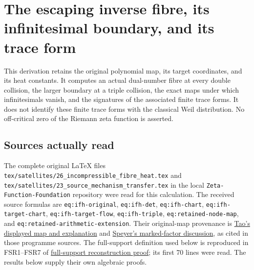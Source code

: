 \documentclass[
  10pt,
  a4paper,
]{article}
\author{}
\date{}
\begin{document}
{
\setcounter{tocdepth}{3}
\tableofcontents
}
\section{The escaping inverse fibre, its infinitesimal boundary, and its
trace
form}\label{the-escaping-inverse-fibre-its-infinitesimal-boundary-and-its-trace-form}

This derivation retains the original polynomial map, its target
coordinates, and its heat constants. It computes an actual dual-number
fibre at every double collision, the larger boundary at a triple
collision, the exact maps under which infinitesimals vanish, and the
signatures of the associated finite trace forms. It does not identify
these finite trace forms with the classical Weil distribution. No
off-critical zero of the Riemann zeta function is asserted.

\subsection{Sources actually read}\label{sources-actually-read}

The complete original LaTeX files
\texttt{tex/\allowbreak{}satellites/\allowbreak{}26\_\allowbreak{}incompressible\_\allowbreak{}fibre\_\allowbreak{}heat.\allowbreak{}tex} and
\texttt{tex/\allowbreak{}satellites/\allowbreak{}23\_\allowbreak{}source\_\allowbreak{}mechanism\_\allowbreak{}transfer.\allowbreak{}tex} in the local
\texttt{Zeta-\allowbreak{}Function-\allowbreak{}Foundation} repository were read for this
calculation. The received source formulas are \texttt{eq:\allowbreak{}ifh-\allowbreak{}original},
\texttt{eq:\allowbreak{}ifh-\allowbreak{}det}, \texttt{eq:\allowbreak{}ifh-\allowbreak{}chart},
\texttt{eq:\allowbreak{}ifh-\allowbreak{}target-\allowbreak{}chart}, \texttt{eq:\allowbreak{}ifh-\allowbreak{}target-\allowbreak{}flow},
\texttt{eq:\allowbreak{}ifh-\allowbreak{}triple}, \texttt{eq:\allowbreak{}retained-\allowbreak{}node-\allowbreak{}map}, and
\texttt{eq:\allowbreak{}retained-\allowbreak{}arithmetic-\allowbreak{}extension}. Their original-map provenance
is
\href{https://terrytao.wordpress.com/2026/07/21/a-digestion-of-the-jacobian-conjecture-counterexample/}{Tao's
displayed map and explanation} and
\href{https://sbseminar.wordpress.com/2026/07/20/the-new-counterexample-to-the-jacobian-conjecture/}{Speyer's
marked-factor discussion}, as cited in those programme sources. The
full-support definition used below is reproduced in FSR1--FSR7 of
\href{https://github.com/KokunoYumeto/zeta-function-research-reader/blob/173dbc6ed5a03235dbe7654f928f3692107db39b/workbenches/splitzero-tandem/branches/tau-zero-prime-positivity/FULL_SUPPORT_RECONSTRUCTION_DERIVATION.md}{full-support
reconstruction proof}; its first 70 lines were read. The results below
supply their own algebraic proofs.
\end{document}
